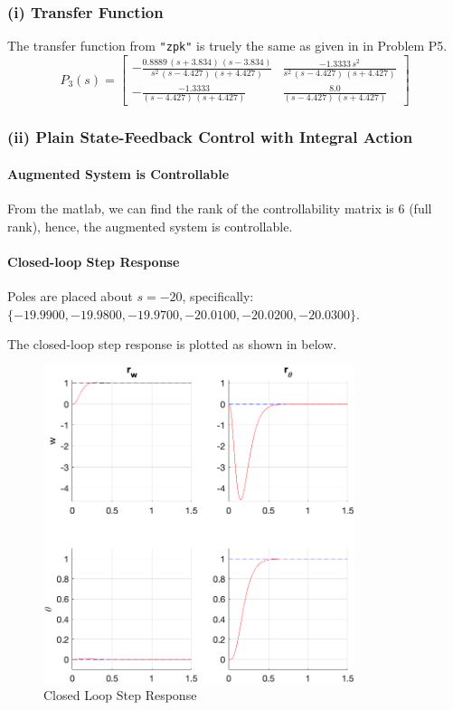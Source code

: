 \documentclass{tron}
\begin{document}
\subsubsection{(i) Transfer Function}
The transfer function from \verb|"zpk"| is truely the same as given in  in Problem P5.
\begin{equation}
	P_{3}(s) = 
	\begin{bmatrix}
		-\frac{0.8889\,(s+3.834)\,(s-3.834)}{s^2\,(s-4.427)\,(s+4.427)} & \frac{-1.3333\,s^2}{s^2 \, (s-4.427)\,(s+4.427)} \\
		-\frac{-1.3333}{(s-4.427)\,(s+4.427)} & \frac{8.0}{(s-4.427)\,(s+4.427)}
	\end{bmatrix}
	\label{eqn:p5:p3-actual2}
\end{equation}

\subsubsection{(ii) Plain State-Feedback Control with Integral Action}
\paragraph{Augmented System is Controllable}
From the matlab, we can find the rank of the controllability matrix is 6 (full rank), hence, the augmented system is controllable.

\paragraph{Closed-loop Step Response}
Poles are placed about $s=-20$, specifically: $\{-19.9900 , -19.9800 , -19.9700 , -20.0100 , -20.0200 , -20.0300\}$.

The closed-loop step response is plotted as shown in  below.
\begin{figure}[H]
	\centering
	\includegraphics[height=350px]{../matlab/output/p6/mimo_response_IC=0}
	\caption{Closed Loop Step Response}
	\label{fig:p6a:step-response}
\end{figure}
\end{document}
